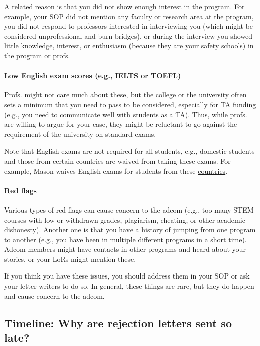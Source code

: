 \documentclass[oneside,11pt,dvipsnames]{book}
\def\sectioninfo#1{%
  \addcontentsline{toc}{sectioninfo}{%
    \noexpand\numberline{}\color{black}{#1}}%
}
\begin{document}
A related reason is that you did not show enough interest in the program.
For example, your SOP did not mention any faculty or research area at the program, you did not respond to professors interested in interviewing you (which might be considered unprofessional and burn bridges), or during the interview you showed little knowledge, interest, or enthusiasm (because they are your safety schools) in the program or profs.


\paragraph{Low English exam scores (e.g., IELTS or TOEFL)}  Profs. might not care much about these, but the college or the university often sets a minimum that you need to pass to be considered, especially for TA funding (e.g., you need to communicate well with students as a TA).  Thus, while profs. are willing to argue for your case, they might be reluctant to go against the requirement of the university on standard exams.  

Note that English exams are not required for all students, e.g., domestic students and those from certain countries are waived from taking these exams.  For example, Mason waives English exams for students from these \href{https://github.com/dynaroars/dynaroars.github.io/wiki/About-Mason#standard-tests-waiver-eligible-countries}{countries}.


\paragraph{Red flags} Various types of red flags can cause concern to the adcom (e.g., too many STEM courses with low or withdrawn grades, plagiarism, cheating, or other academic dishonesty). Another one is that you have a history of jumping from one program to another (e.g., you have been in multiple different programs in a short time). Adcom members might have contacts in other programs and heard about your stories, or your LoRs might mention these.

If you think you have these issues, you should address them in your SOP or ask your letter writers to do so.
In general, these things are rare, but they do happen and cause concern to the adcom.




\subsection{Timeline: Why are rejection letters sent so late?}\label{sec:late-rejection}
\sectioninfo{Why rejection letters are sent so late? Grad programs often wait for the accepted students to make their decisions, typically by April 15, before sending out rejection letters.}
\end{document}

